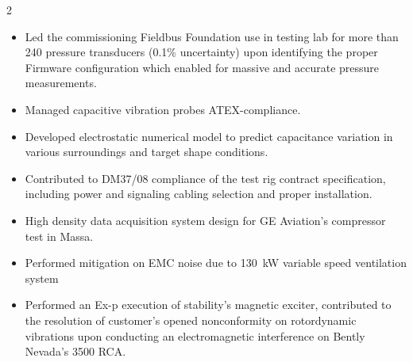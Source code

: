 \documentclass[9pt,a4paper,ragged2e,withhyper]{altacv} %
\begin{document}
\begin{paracol}{2}
\begin{itemize}
\item Led the commissioning Fieldbus Foundation use in testing lab for more than 240 pressure transducers (0.1\% uncertainty) upon identifying the proper Firmware configuration which enabled for massive and accurate pressure measurements.
\item Managed capacitive vibration probes ATEX-compliance.
\item Developed electrostatic numerical model to predict capacitance variation in various surroundings and target shape conditions.
\item Contributed to DM37/08 compliance of the test rig contract specification, including power and signaling cabling selection and proper installation.
\end{itemize}
\divider

\begin{itemize}
\item High density data acquisition system design for GE Aviation's compressor test in Massa.
\item Performed mitigation on EMC noise due to 130~kW variable speed ventilation system
\end{itemize}


\divider

\begin{itemize}
\item Performed an Ex-p execution of stability's magnetic exciter, contributed to the resolution of customer's opened nonconformity on rotordynamic vibrations upon conducting an electromagnetic interference on Bently Nevada's 3500 RCA.
\end{itemize}
\divider


\end{paracol}
\end{document}
